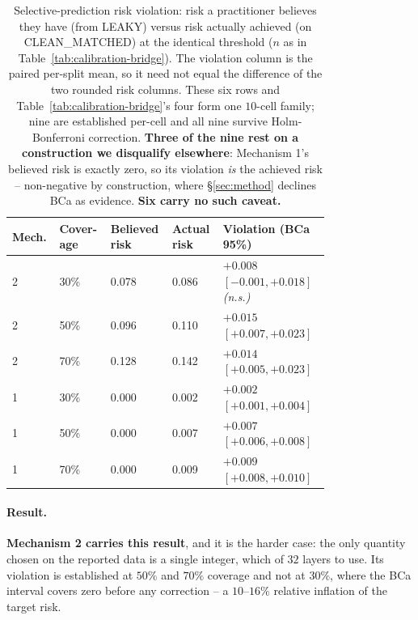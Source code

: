 \documentclass{article}
\begin{document}
\begin{table}[t]
\centering
\small
{\setlength{\tabcolsep}{3pt}
\begin{tabular}{@{}p{0.08\linewidth}p{0.13\linewidth}p{0.13\linewidth}p{0.12\linewidth}p{0.32\linewidth}@{}}
\toprule
Mech. & Cover-\newline age & Believed risk & Actual risk & Violation (BCa 95\%) \\
\midrule
2 & 30\% & 0.078 & 0.086 & $+0.008$ $[-0.001,+0.018]$ \emph{(n.s.)} \\
2 & 50\% & 0.096 & 0.110 & $+0.015$ $[+0.007,+0.023]$ \\
2 & 70\% & 0.128 & 0.142 & $+0.014$ $[+0.005,+0.023]$ \\
1 & 30\% & $0.000$ & 0.002 & $+0.002$ $[+0.001,+0.004]$ \\
1 & 50\% & $0.000$ & 0.007 & $+0.007$ $[+0.006,+0.008]$ \\
1 & 70\% & $0.000$ & 0.009 & $+0.009$ $[+0.008,+0.010]$ \\
\bottomrule
\end{tabular}}
\caption{Selective-prediction risk violation: risk a practitioner believes
they have (from LEAKY) versus risk actually achieved (on CLEAN\_MATCHED) at
the identical threshold ($n$ as in Table~\ref{tab:calibration-bridge}). The
violation column is the paired per-split mean, so it need not equal the
difference of the two rounded risk columns. These six rows and
Table~\ref{tab:calibration-bridge}'s four form one $10$-cell family; nine are
established per-cell and all nine survive Holm-Bonferroni correction.
\textbf{Three of the nine rest on a construction we disqualify elsewhere}:
Mechanism 1's believed risk is exactly zero, so its violation \emph{is} the
achieved risk -- non-negative by construction, where \S\ref{sec:method}
declines BCa as evidence. \textbf{Six carry no such caveat.}}
\label{tab:selective-prediction}
\end{table}

\paragraph{Result.} \textbf{Mechanism 2 carries this result}, and it is the
harder case: the only quantity chosen on the reported data is a single
integer, which of $32$ layers to use. Its violation is established at $50\%$ and
$70\%$ coverage and not at $30\%$, where the BCa interval covers zero before
any correction -- a $10$--$16\%$ relative inflation of the target risk.
\end{document}
